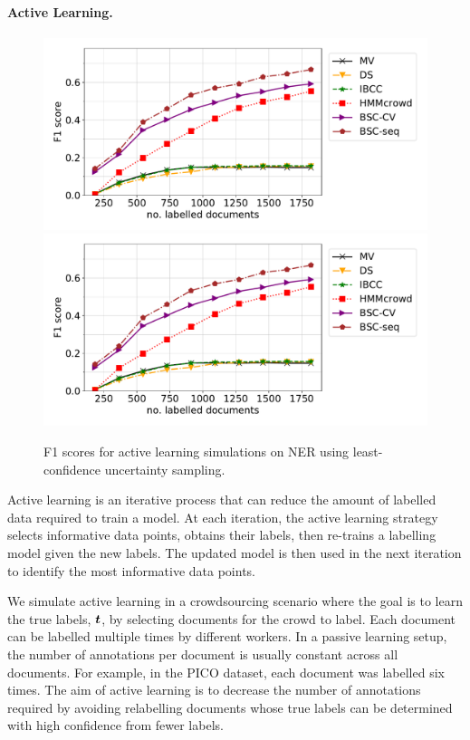  \paragraph{Active Learning. }
 \begin{figure}[h]
 \centering
   \includegraphics[width=0.3\columnwidth, clip=True, trim=530 160 20 20]{figures/NER_AL/pool/plot_F1-score.pdf}
      \includegraphics[width=0.9\columnwidth, clip=True, trim=40 22 190 15]{figures/NER_AL/pool/plot_F1-score.pdf}
 \caption{F1 scores for active learning simulations on NER using least-confidence 
 uncertainty sampling.
 }
 \label{fig:alner}
 \end{figure}
 Active learning is an iterative process that can reduce the amount of labelled
  data required to train a model.
  At each iteration, the active learning strategy selects informative data points,
  obtains their labels, 
  then re-trains a labelling model given the new labels.
 The updated model is then used in the next iteration to identify the most
 informative data points.  
 
  We simulate active learning in a crowdsourcing scenario
  where the goal is to learn the true labels,
  $\boldsymbol t$, by selecting documents for the crowd to label.
  Each document can be labelled multiple times by different workers.
  In a passive learning setup, the number of annotations per document is 
  usually constant across all documents. 
  For example, in the PICO dataset, each
  document was labelled six times.
  The aim of active learning is to decrease the number of annotations required
  by avoiding relabelling documents whose true labels can be determined with  high confidence from fewer labels.
  
